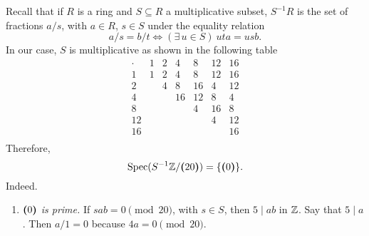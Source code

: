 \begin{solution}
    Recall that if $R$ is a ring and $S\subseteq R$ a multiplicative subset, $S^{-1}R$ is the set of fractions $a/s$, with $a\in R$, $s\in S$ under the equality relation
    $$
        a/s=b/t \iff (\exists\,u\in S)\ uta=usb.
    $$
    In our case, $S$ is multiplicative as shown in the following table
    \small
    $$
    \begin{array}{c|rrrrrr}
        \cdot & 1 & 2 & 4 & 8 & 12 & 16 \\
        \hline
        1  & 1 & 2 & 4  & 8  & 12 & 16 \\
        2  &   & 4 & 8  & 16 & 4  & 12 \\
        4  &   &   & 16 & 12 & 8  & 4 \\
        8  &   &   &    & 4  & 16 & 8 \\
        12 &   &   &    &    & 4  & 12 \\
        16 &   &   &    &    &    & 16 \\
    \end{array}
    $$
    \normalsize
    Therefore,
    $$
        \operatorname{Spec}(S^{-1}\mathbb{Z}/\textrm{\boldmath$($}20\textrm{\boldmath$)$}) = \{\textrm{\boldmath$($}0\textrm{\boldmath$)$}\}.
    $$
    Indeed.
    \begin{enumerate}[-]
        \item \textit{$\textrm{\boldmath$($}0\textrm{\boldmath$)$}$ is prime.} If $sab=0\pmod{20}$, with $s\in S$, then $5\mid ab$ in $\mathbb{Z}$. Say that $5\mid a$. Then $a/1=0$ because $4a=0\pmod{20}$.


\end{enumerate}
\end{solution}

